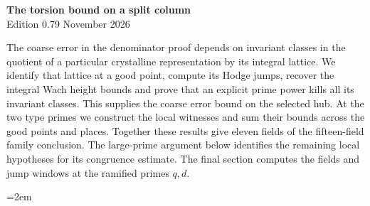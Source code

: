 \begin{center}
{\Large\bfseries The torsion bound on a split column}\\[4pt]
Edition 0.79  November 2026
\end{center}

The coarse error in the denominator proof depends on invariant classes in
the quotient of a particular crystalline representation by its integral
lattice. We identify that lattice at a good point, compute its Hodge
jumps, recover the integral Wach height bounds and prove that an
explicit prime power kills all its invariant classes. This supplies the
coarse error bound on the selected hub. At the two type primes we
construct the local witnesses and sum their bounds across the good points
and places. Together these results give eleven fields of the fifteen-field
family conclusion. The large-prime argument below identifies the
remaining local hypotheses for its congruence estimate. The final section
computes the fields and jump windows at the ramified primes $q,d$.

\begingroup\emergencystretch=2em










\endgroup
